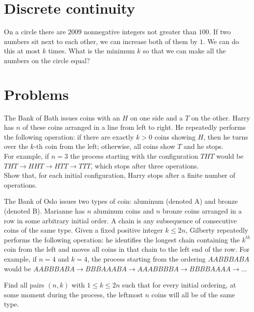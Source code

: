 \section{Discrete continuity}

\begin{example}[Russia 2009]
    On a circle there are $2009$ nonnegative integers not greater than $100$. If two numbers sit next to each other, we can increase both of them by $1$. We can do this at most $ k$ times. What is the minimum $ k$ so that we can make all the numbers on the circle equal?
\end{example}

\section{Problems}

\begin{problem}[IMO 2019]
   The Bank of Bath issues coins with an $H$ on one side and a $T$ on the other. Harry has $n$ of these coins arranged in a line from left to right. He repeatedly performs the following operation: if there are exactly $k>0$ coins showing $H$, then he turns over the $k$-th coin from the left; otherwise, all coins show $T$ and he stops. \\ For example, if $n=3$ the process starting with the configuration $THT$ would be $THT \to HHT \to HTT \to TTT$, which stops after three operations. \\ Show that, for each initial configuration, Harry stops after a finite number of operations.
\end{problem}

\begin{problem}[IMO 2022]
    The Bank of Oslo issues two types of coin: aluminum (denoted A) and bronze (denoted B). Marianne has $n$ aluminum coins and $n$ bronze coins arranged in a row in some arbitrary initial order. A chain is any subsequence of consecutive coins of the same type. Given a fixed positive integer $k \leq 2n$, Gilberty repeatedly performs the following operation: he identifies the longest chain containing the $k^{th}$ coin from the left and moves all coins in that chain to the left end of the row. For example, if $n=4$ and $k=4$, the process starting from the ordering $AABBBABA$ would be $AABBBABA \to BBBAAABA \to AAABBBBA \to BBBBAAAA \to \dots$

    Find all pairs $(n,k)$ with $1 \leq k \leq 2n$ such that for every initial ordering, at some moment during the process, the leftmost $n$ coins will all be of the same type.
\end{problem}

